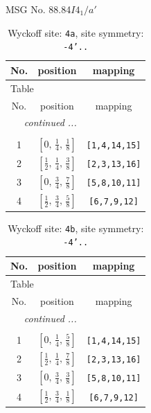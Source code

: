 \documentclass[fleqn,8pt]{jsarticle}
\begin{document}
\setcounter{MaxMatrixCols}{32}

\renewcommand{\tablename}{Table~}
\renewcommand{\figurename}{Figure~}
\begin{center}
\LARGE
MSG No. 88.84\quad$I4_{1}/a'$
\end{center}
\renewcommand{\arraystretch}{1.2}
\begin{longtable}{ccc}
\caption{Wyckoff site: {\tt 4a}, site symmetry: {\tt -4'..}}
 \\
 \hline \hline
No. & position & mapping \\ \hline \endfirsthead

\multicolumn{2}{l}{\tablename\ \thetable{}} \\
 \hline \hline
No. & position & mapping \\ \hline \endhead

 \hline \hline
\multicolumn{2}{r}{\footnotesize\it continued ...} \\ \endfoot

 \hline \hline
\multicolumn{2}{r}{} \\ \endlastfoot

1 & $\left[ 0,\, \frac{1}{4},\, \frac{1}{8} \right]$ & {\tt [1,4,14,15]} \\ \hline
2 & $\left[ \frac{1}{2},\, \frac{1}{4},\, \frac{3}{8} \right]$ & {\tt [2,3,13,16]} \\ \hline
3 & $\left[ 0,\, \frac{3}{4},\, \frac{7}{8} \right]$ & {\tt [5,8,10,11]} \\ \hline
4 & $\left[ \frac{1}{2},\, \frac{3}{4},\, \frac{5}{8} \right]$ & {\tt [6,7,9,12]} \\
\end{longtable}
\renewcommand{\arraystretch}{1.2}
\begin{longtable}{ccc}
\caption{Wyckoff site: {\tt 4b}, site symmetry: {\tt -4'..}}
 \\
 \hline \hline
No. & position & mapping \\ \hline \endfirsthead

\multicolumn{2}{l}{\tablename\ \thetable{}} \\
 \hline \hline
No. & position & mapping \\ \hline \endhead

 \hline \hline
\multicolumn{2}{r}{\footnotesize\it continued ...} \\ \endfoot

 \hline \hline
\multicolumn{2}{r}{} \\ \endlastfoot

1 & $\left[ 0,\, \frac{1}{4},\, \frac{5}{8} \right]$ & {\tt [1,4,14,15]} \\ \hline
2 & $\left[ \frac{1}{2},\, \frac{1}{4},\, \frac{7}{8} \right]$ & {\tt [2,3,13,16]} \\ \hline
3 & $\left[ 0,\, \frac{3}{4},\, \frac{3}{8} \right]$ & {\tt [5,8,10,11]} \\ \hline
4 & $\left[ \frac{1}{2},\, \frac{3}{4},\, \frac{1}{8} \right]$ & {\tt [6,7,9,12]} \\
\end{longtable}
\end{document}
